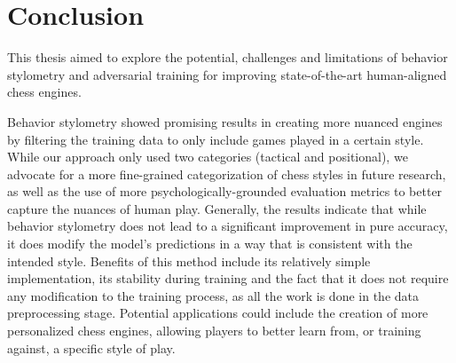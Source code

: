 \chapter{Conclusion}
\label{chapter:conclusion}

This thesis aimed to explore the potential, challenges and limitations of behavior stylometry and adversarial training for improving state-of-the-art human-aligned chess engines.

Behavior stylometry showed promising results in creating more nuanced engines by filtering the training data to only include games played in a certain style.
While our approach only used two categories (tactical and positional), we advocate for a more fine-grained categorization of chess styles in future research, as well as the use of more psychologically-grounded evaluation metrics to better capture the nuances of human play.
Generally, the results indicate that while behavior stylometry does not lead to a significant improvement in pure accuracy, it does modify the model's predictions in a way that is consistent with the intended style.
Benefits of this method include its relatively simple implementation, its stability during training and the fact that it does not require any modification to the training process, as all the work is done in the data preprocessing stage.
Potential applications could include the creation of more personalized chess engines, allowing players to better learn from, or training against, a specific style of play.

